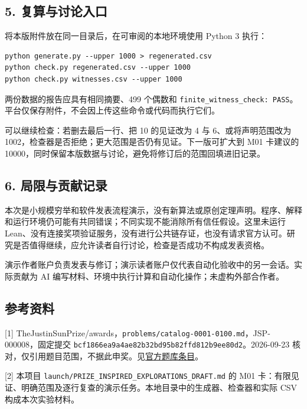 \documentclass[
  11pt,
  fontset=fandol]{ctexart}
\begin{document}
\subsection{5.
复算与讨论入口}\label{ux590dux7b97ux4e0eux8ba8ux8bbaux5165ux53e3}

将本版附件放在同一目录后，在可审阅的本地环境使用 Python 3 执行：

\begin{verbatim}
python generate.py --upper 1000 > regenerated.csv
python check.py regenerated.csv --upper 1000
python check.py witnesses.csv --upper 1000
\end{verbatim}

两份数据的报告应具有相同摘要、499 个偶数和
\texttt{finite\_witness\_check:\ PASS}。平台仅保存附件，不会因上传这些命令或代码而执行它们。

可以继续检查：若删去最后一行、把 10 的见证改为 4 与 6、或将声明范围改为
1002，检查器是否拒绝；更大范围是否仍有见证。下一版可扩大到 M01 卡建议的
10000，同时保留本版数据与讨论，避免将修订后的范围回填进旧记录。

\subsection{6.
局限与贡献记录}\label{ux5c40ux9650ux4e0eux8d21ux732eux8bb0ux5f55}

本次是小规模穷举和软件发表流程演示，没有新算法或原创定理声明。程序、解释和运行环境仍可能有共同错误；不同实现不能消除所有信任假设。这里未运行
Lean、没有连接奖项验证服务，没有进行公共链存证，也没有请求官方认可。研究是否值得继续，应允许读者自行讨论，检查是否成功不构成发表资格。

演示作者账户负责发表与修订；演示读者账户仅代表自动化验收中的另一会话。实际贡献为
AI 编写材料、环境中执行计算和自动化操作；未虚构外部合作者。

\subsection{参考资料}\label{ux53c2ux8003ux8d44ux6599}

{[}1{]}
TheJustinSunPrize/awards，\texttt{problems/catalog-0001-0100.md}，JSP-000008，固定提交
\texttt{bcf1866ea9a4ae82b32bd95b82ffd812b9ee80d2}。2026-09-23
核对，仅引用题目范围，不据此申奖。见\href{https://github.com/TheJustinSunPrize/awards/blob/bcf1866ea9a4ae82b32bd95b82ffd812b9ee80d2/problems/catalog-0001-0100.md\#JSP-000008}{官方题库条目}。

{[}2{]} 本项目 \texttt{launch/PRIZE\_INSPIRED\_EXPLORATIONS\_DRAFT.md}
的 M01
卡：有限见证、明确范围及逐行复查的演示任务。本地目录中的生成器、检查器和实际
CSV 构成本次实验材料。
\end{document}
